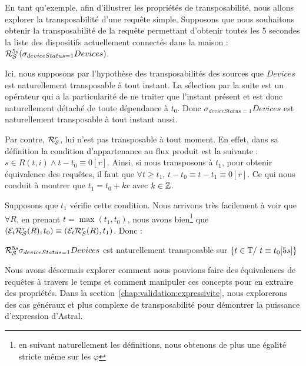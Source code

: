 \begin{example}
	En tant qu'exemple, afin d'illustrer les propriétés de transposabilité, nous allons explorer la transposabilité d'une requête simple. Supposons que nous souhaitons obtenir la transposabilité de la requête permettant d'obtenir toutes les 5 secondes la liste des dispositifs actuellement connectés dans la maison : $\mathcal{R}_{\mathcal S}^{5s} (\sigma_{deviceStatus=1} Devices)$. 
	
	Ici, nous supposons par l'hypothèse des transposabilités des sources que $Devices$ est naturellement transposable à tout instant. La sélection par la suite est un opérateur qui a la particularité de ne traiter que l'instant présent et est donc naturellement détaché de toute dépendance à $t_0$. Donc $\sigma_{deviceStatus=1} Devices$ est naturellement transposable à tout instant aussi.
	
	Par contre, $\mathcal{R}_{\mathcal S}^{r}$, lui n'est pas transposable à tout moment. En effet, dans sa définition la condition d'appartenance au flux produit est la suivante : $s \in R(t,i)\wedge t-t_0 \equiv 0[r]$. Ainsi, si nous transposons à $t_1$, pour obtenir équivalence des requêtes, il faut que $\forall t \geq t_1$, $t-t_0\equiv t-t_1\equiv 0[r]$.  Ce qui nous conduit à montrer que $t_1 = t_0 +kr$ avec $k\in \mathbb{Z}$. 
	
	Supposons que $t_1$ vérifie cette condition. Nous arrivons très facilement à voir que $\forall R$, en prenant $t=\max(t_1,t_0)$, nous avons bien\footnote{en suivant naturellement les définitions, nous obtenons de plus une égalité stricte même sur les $\varphi$} que $(\mathcal{E}_{t}\mathcal{R}_{\mathcal S}^{r}(R),t_0) \equiv (\mathcal{E}_{t}\mathcal{R}_{\mathcal S}^{r}(R),t_1)$. Donc :
	\begin{center}$\mathcal{R}_{\mathcal S}^{5s}\sigma_{deviceStatus=1} Devices$ est naturellement transposable sur $\{t\in \mathbb{T} /\ t\equiv t_0 [5s]\}$\end{center}
\end{example}

Nous avons désormais explorer comment nous pouvions faire des équivalences de requêtes à travers le temps et comment manipuler ces concepts pour en extraire des propriétés. Dans la section~\ref{chap:validation:expressivite}, nous explorerons des cas généraux et plus complexe de transposabilité pour démontrer la puissance d'expression d'Astral.